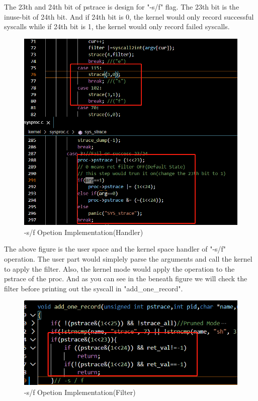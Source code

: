\documentclass[11pt,oneside,a4paper]{article}
\begin{document}
The 23th and 24th bit of pstrace is design for "-s/f" flag. The 23th bit is the 
inuse-bit of 24th bit. And if 24th bit is 0, the kernel would only record successful
syscalls while if 24th bit is 1, the kernel would only record failed syscalls.

\begin{figure}[H]
    \includegraphics[width=4.75in]{1-22.png}
    \centering
    \caption{-s/f Opetion Implementation(Handler)}
\end{figure}

The above figure is the user space and the kernel space handler of "-s/f" operation.
The user part would simplely parse the arguments and call the kernel to apply the filter.
Also, the kernel mode would apply the operation to the pstrace of the proc. And as you
can see in the beneath figure we will check the filter before printing out the syscall in "add\_one\_record".

\begin{figure}[H]
    \includegraphics[width=4.75in]{1-23.png}
    \centering
    \caption{-s/f Opetion Implementation(Filter)}
\end{figure}
\end{document}
